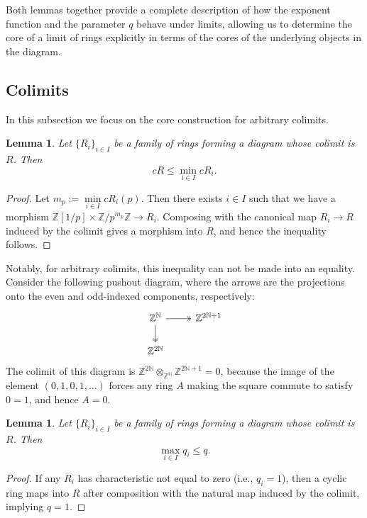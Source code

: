 \documentclass{amsart}
\newtheorem{lemma}[subsection]{Lemma}
\newcommand{\N}{{\mathbb N}}
\newcommand{\Z}{{\mathbb Z}}
\begin{document}
    Both lemmas together provide a complete description of how the exponent function and the parameter $q$ behave under limits, allowing us to determine the core of a limit of rings explicitly in terms of the cores of the underlying objects in the diagram.

    \subsection{Colimits}

    In this subsection we focus on the core construction for arbitrary colimits.
    
    \begin{lemma}
    \label{lm:colimit_c}
        Let $\{R_i\}_{i \in I}$ be a family of rings forming a diagram whose colimit is $R$.
        Then
        $$
        cR \leq \min\limits_{i \in I} cR_i.
        $$
    \end{lemma}
    \begin{proof}
        Let $m_p := \min\limits_{i \in I} cR_i(p)$.
        Then there exists $i \in I$ such that we have a morphism $\Z[1/p] \times \Z/p^{m_p}\Z \to R_i$. Composing with the canonical map $R_i \to R$ induced by the colimit gives a morphism into $R$, and hence the inequality follows.
    \end{proof}

    Notably, for arbitrary colimits, this inequality can not be made into an equality.
    Consider the following pushout diagram, where the arrows are the projections onto the even and odd-indexed components, respectively:
    $$
    \begin{tikzcd}
    \Z^\N \arrow[d, two heads] \arrow[r, two heads] & \Z^{2\N+1} \\
    \Z^{2\N}                                        &           
    \end{tikzcd}
    $$
    The colimit of this diagram is $\Z^{2\N} \otimes_{\Z^\N} \Z^{2\N+1} = 0$, because the image of the element $(0,1,0,1,\dots)$ forces any ring $A$ making the square commute to satisfy $0 = 1$, and hence $A = 0$.\\

    \begin{lemma}
        Let $\{R_i\}_{i \in I}$ be a family of rings forming a diagram whose colimit is $R$.
        Then
        $$
        \max\limits_{i \in I} q_i \leq q.
        $$
    \end{lemma}
    \begin{proof}
        If any $R_i$ has characteristic not equal to zero (i.e., $q_i = 1$), then a cyclic ring maps into $R$ after composition with the natural map induced by the colimit, implying $q = 1$.
    \end{proof}
\end{document}
